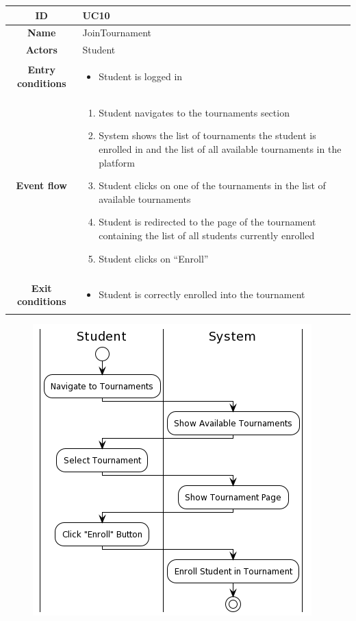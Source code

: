 \begin{center}
    \begin{tabular}{ |c|m{10cm}| }
        \hline
        \textbf{ID} & UC10 \\
        \hline
        \textbf{Name} & JoinTournament \\
        \hline
        \textbf{Actors} & Student \\
        \hline
        \textbf{Entry conditions} &
        \begin{itemize}
            \item Student is logged in
        \end{itemize} \\
        \hline
        \textbf{Event flow} &
        \begin{enumerate}
            \item Student navigates to the tournaments section
            \item System shows the list of tournaments the student is enrolled in and the list of all available tournaments in the platform
            \item Student clicks on one of the tournaments in the list of available tournaments
            \item Student is redirected to the page of the tournament containing the list of all students currently enrolled
            \item Student clicks on “Enroll”
        \end{enumerate} \\
        \hline
        \textbf{Exit conditions} &
        \begin{itemize}
            \item Student is correctly enrolled into the tournament
        \end{itemize} \\
        \hline
    \end{tabular}
    \begin{figure}[H]
        \hspace{80px}
        \includegraphics[scale=0.5]{Diagrams/activity_jointournament.png}

\end{figure}
\end{center}

